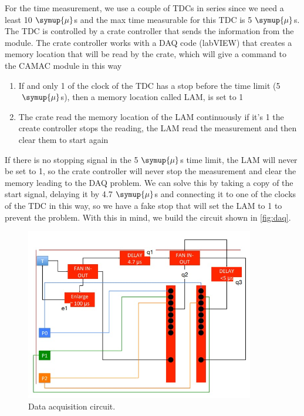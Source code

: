 For the time measurement, we use a couple of TDCs in series since we need a least 10$\;\symup{\mu}$s
and the max time measurable for this TDC is 5$\;\symup{\mu}$s.
The TDC is controlled by a crate controller that sends the information 
from the module. The crate controller works with a DAQ code (labVIEW) 
that creates a memory location that will be read by the crate, which will give a command to the
CAMAC module in this way
\begin{enumerate}
  \item If and only 1 of the clock of the TDC has a stop before the time limit (5$\;\symup{\mu}$s), then a memory location called LAM, is set to 1
  \item The crate read the memory location of the LAM continuously if it's 1 the create controller stops the reading, the LAM read the measurement and then clear them to start again
\end{enumerate}
 If there is no stopping signal in the 5$\;\symup{\mu}$s time limit, the LAM will never be set to 1, so the crate controller will never stop the measurement and clear the memory leading to the DAQ problem. We can solve this by taking a copy of the start signal, delaying it by 4.7$\;\symup{\mu}$s and connecting it to one of the clocks of the TDC in this way, so we have
a fake stop that will set the LAM to 1 to prevent the problem. With this in mind, we build the circuit shown in \autoref{fig:daq}.\\
\begin{figure}[h]
\begin{center}
\includegraphics[width=100mm]{figures/cattura4.png}
\end{center}
\caption{Data acquisition circuit.}
\label{fig:daq}
\end{figure}

